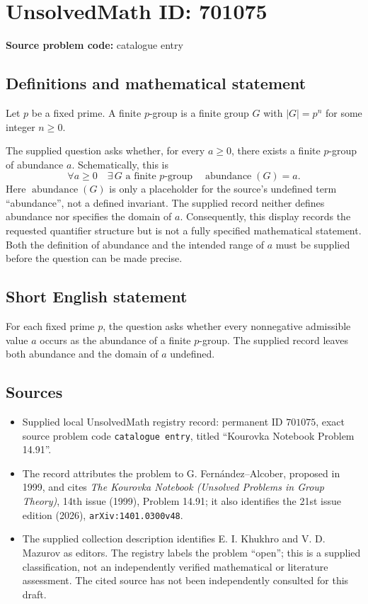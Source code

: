 \documentclass[11pt]{article}
\begin{document}
\section*{UnsolvedMath ID: 701075}
\textbf{Source problem code:} catalogue entry
\subsection{Definitions and mathematical statement}
Let \(p\) be a fixed prime. A finite \(p\)-group is a finite group \(G\) with \(|G|=p^n\) for some integer \(n\geq 0\).

The supplied question asks whether, for every \(a\geq 0\), there exists a finite \(p\)-group of abundance \(a\). Schematically, this is
\[
\forall a\geq 0\quad \exists\,G\text{ a finite }p\text{-group}\quad \operatorname{abundance}(G)=a.
\]
Here \(\operatorname{abundance}(G)\) is only a placeholder for the source's undefined term ``abundance'', not a defined invariant. The supplied record neither defines abundance nor specifies the domain of \(a\). Consequently, this display records the requested quantifier structure but is not a fully specified mathematical statement. Both the definition of abundance and the intended range of \(a\) must be supplied before the question can be made precise.
\subsection{Short English statement}
For each fixed prime \(p\), the question asks whether every nonnegative admissible value \(a\) occurs as the abundance of a finite \(p\)-group. The supplied record leaves both abundance and the domain of \(a\) undefined.
\subsection{Sources}
\begin{itemize}
\item Supplied local UnsolvedMath registry record: permanent ID \(701075\), exact source problem code \texttt{catalogue entry}, titled ``Kourovka Notebook Problem 14.91''.
\item The record attributes the problem to G. Fern\'andez--Alcober, proposed in 1999, and cites \emph{The Kourovka Notebook (Unsolved Problems in Group Theory)}, 14th issue (1999), Problem 14.91; it also identifies the 21st issue edition (2026), \texttt{arXiv:1401.0300v48}.
\item The supplied collection description identifies E. I. Khukhro and V. D. Mazurov as editors. The registry labels the problem ``open''; this is a supplied classification, not an independently verified mathematical or literature assessment. The cited source has not been independently consulted for this draft.
\end{itemize}
\end{document}
